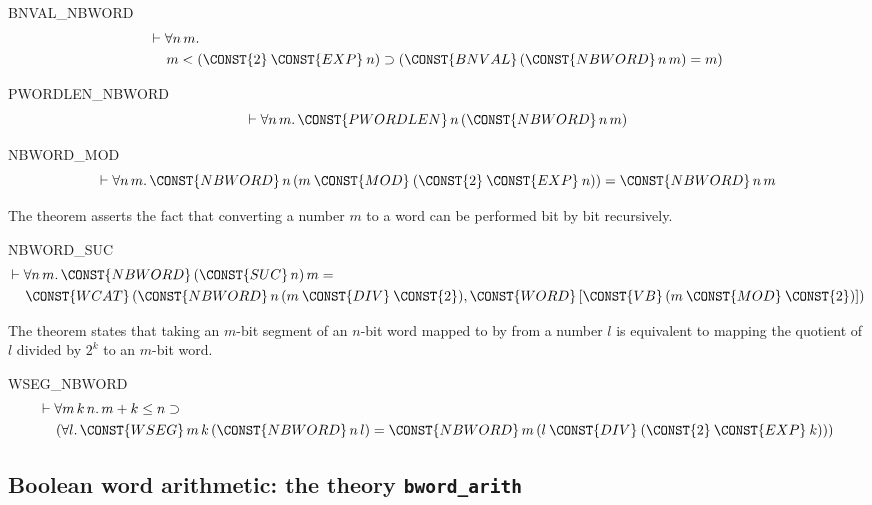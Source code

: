 \begin{holthm}{BNVAL_NBWORD}
\begin{eqnarray*}
\lefteqn{\THM \FORALL n \,m\DOT} \\
 & & m \LES  ( \CONST{2} \:\CONST{EXP}\:n ) \IMP
           (\CONST{BNVAL} \,(\CONST{NBWORD} \,n \,m) = m)
\end{eqnarray*}
\end{holthm}
\begin{holthm}{PWORDLEN_NBWORD}
\[\THM \FORALL n \,m\DOT \CONST{PWORDLEN}\,n \,(\CONST{NBWORD} \,n \,m)
\]
\end{holthm}
\begin{holthm}{NBWORD_MOD}
\[ \THM \FORALL n \,m\DOT
        \CONST{NBWORD} \,n
           \,(m \:\CONST{MOD}\: ( \CONST{2} \:\CONST{EXP}\: n )) =
           \CONST{NBWORD} \,n \,m \]
\end{holthm}
The theorem  asserts the fact that converting a
number $m$ to a word can be performed bit by bit recursively.
\begin{holthm}{NBWORD_SUC}
\begin{eqnarray*}
\lefteqn{\THM \FORALL n \,m\DOT
        \CONST{NBWORD} \,(\CONST{SUC} \,n) \,m =} \\
 & & \CONST{WCAT}
              \,(\CONST{NBWORD} \,n
                    \,(m \:\CONST{DIV}\: \CONST{2}),
                 \CONST{WORD}
                    \,[\CONST{VB} \,(m \:\CONST{MOD}\: \CONST{2})])
\end{eqnarray*}
\end{holthm}
The theorem  states that taking an $m$-bit segment
of an $n$-bit word mapped to by  from a number $l$ is
equivalent to mapping the quotient of $l$ divided by $2^k$ to an
$m$-bit word.
\begin{holthm}{WSEG_NBWORD}
\begin{eqnarray*}
\lefteqn{\THM \FORALL m \,k \,n\DOT
        m + k \LEE  n \IMP }\\
 & & (\FORALL l\DOT\CONST{WSEG} \,m \,k \,(\CONST{NBWORD} \,n \,l) =
               \CONST{NBWORD} \,m
                  \,(l \:\CONST{DIV}\: ( \CONST{2} \:\CONST{EXP}\: k )))
\end{eqnarray*}
\end{holthm}

\subsection{Boolean word arithmetic: the theory {\tt bword\_arith}}

